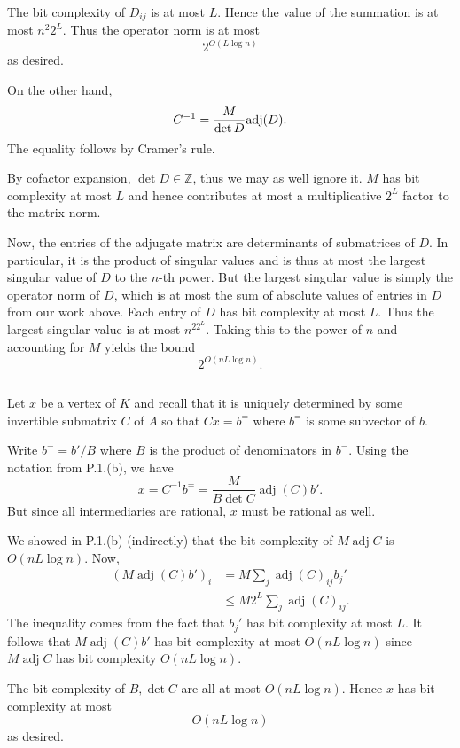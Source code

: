 \documentclass[10pt]{article}
\let\abs\relax
\DeclarePairedDelimiter{\abs}{\lvert}{\rvert}
\let\norm\relax
\DeclarePairedDelimiter{\norm}{\lVert}{\rVert}
\DeclareMathOperator{\adj}{adj}
\newcommand{\Z}{\mathbb{Z}}
\begin{document}
The bit complexity of $D_{ij}$ is at most $L$.
Hence the value of the summation is at most $n^2 2^L$.
Thus the operator norm is at most
\[
  2^{O\left( L\log n \right)}
\]
as desired.

On the other hand,
\[
  \norm{C^{-1}}
  = \frac{M}{\abs{\det D}} \norm{\adj(D)}.
\]
The equality follows by Cramer's rule.

By cofactor expansion,
$\det D\in \Z$,
thus we may as well ignore it.
$M$ has bit complexity at most $L$
and hence contributes at most a multiplicative $2^L$ factor to the matrix norm.

Now,
the entries of the adjugate matrix are determinants of submatrices of $D$.
In particular,
it is the product of singular values and is thus at most the largest singular value of $D$ to the $n$-th power.
But the largest singular value is simply the operator norm of $D$,
which is at most the sum of absolute values of entries in $D$ from our work above.
Each entry of $D$ has bit complexity at most $L$.
Thus the largest singular value is at most $n^22^L$.
Taking this to the power of $n$ and accounting for $M$ yields the bound
\[
  2^{O\left( nL \log n \right)}.
\]

\subsection{}
Let $x$ be a vertex of $K$
and recall that it is uniquely determined by some invertible submatrix $C$ of $A$
so that $Cx = b^=$
where $b^=$ is some subvector of $b$.

Write $b^= = b' / B$ where $B$ is the product of denominators in $b^=$.
Using the notation from P.1.(b),
we have
\[
  x
  = C^{-1} b^=
  = \frac{M}{B \det C} \adj(C) b'.
\]
But since all intermediaries are rational,
$x$ must be rational as well.

We showed in P.1.(b) (indirectly) that the bit complexity of $M \adj C$ is $O(nL \log n)$.
Now,
\begin{align*}
  (M\adj (C) b')_i
  &= M \sum_j \adj(C)_{ij} b_j' \\
  &\leq M2^L \sum_j \adj(C)_{ij}.
\end{align*}
The inequality comes from the fact that $b_j'$ has bit complexity at most $L$.
It follows that $M\adj (C)b'$ has bit complexity at most $O(nL \log n)$
since $M\adj C$ has bit complexity $O(nL\log n)$.

The bit complexity of $B, \det C$ are all at most $O(nL\log n)$.
Hence $x$ has bit complexity at most
\[
  O(nL\log n)
\]
as desired.
\end{document}
